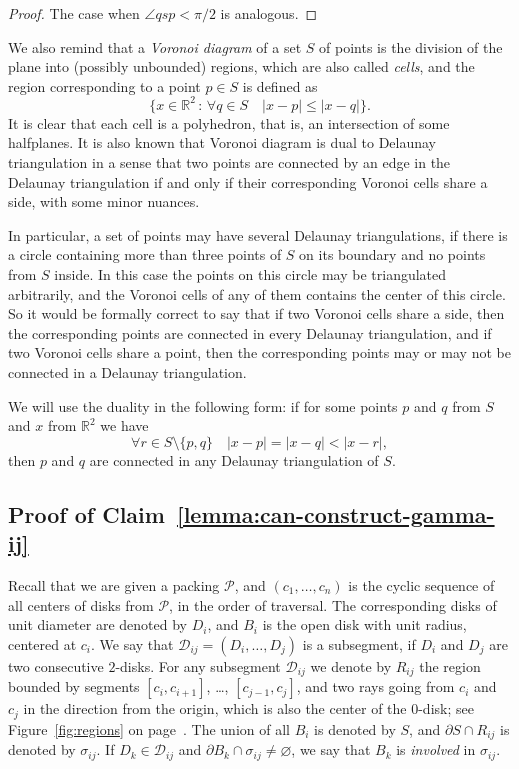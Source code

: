 \begin{appendices}
\begin{proof}
The case when $\angle{qsp} < \pi/2$ is analogous.
\end{proof}

We also remind that a \emph{Voronoi diagram} of a set $S$ of points is the division of the plane into (possibly unbounded) regions, which are also called \emph{cells}, and the region corresponding to a point $p\in S$ is defined as
$$\{x\in\mathbb{R}^2\,\colon\,\forall q\in S\quad |x - p|\leq |x - q|\}.$$
It is clear that each cell is a polyhedron, that is, an intersection of some halfplanes. It is also known that Voronoi diagram is dual to Delaunay triangulation in a sense that two points are connected by an edge in the Delaunay triangulation if and only if their corresponding Voronoi cells share a side, with some minor nuances.

In particular, a set of points may have several Delaunay triangulations, if there is a circle containing more than three points of $S$ on its boundary and no points from $S$ inside. In this case the points on this circle may be triangulated arbitrarily, and the Voronoi cells of any of them contains the center of this circle. So it would be formally correct to say that if two Voronoi cells share a side, then the corresponding points are connected in every Delaunay triangulation, and if two Voronoi cells share a point, then the corresponding points may or may not be connected in a Delaunay triangulation.

We will use the duality in the following form: if for some points $p$ and $q$ from $S$ and $x$ from $\mathbb{R}^2$ we have
$$\forall r\in S\setminus\{p, q\}\quad |x - p| = |x - q| < |x - r|,$$
then $p$ and $q$ are connected in any Delaunay triangulation of $S$.

\subsection{Proof of Claim~\ref{lemma:can-construct-gamma-ij}}

Recall that we are given a packing $\mathcal{P}$, and $(c_1, \ldots, c_n)$ is the cyclic sequence of all centers of disks from $\mathcal{P}$, in the order of traversal. The corresponding disks of unit diameter are denoted by $D_i$, and $B_i$ is the open disk with unit radius, centered at $c_i$. We say that $\mathcal{D}_{ij} = (D_i, \ldots, D_j)$ is a subsegment, if $D_i$ and $D_j$ are two consecutive $2$-disks. For any subsegment $\mathcal{D}_{ij}$ we denote by $R_{ij}$ the region bounded by segments $[c_i, c_{i+1}]$, \ldots, $[c_{j-1}, c_j]$, and two rays going from $c_i$ and $c_j$ in the direction from the origin, which is also the center of the $0$-disk; see Figure~\ref{fig:regions} on page~\pageref{fig:division-into-regions}. The union of all $B_i$ is denoted by $S$, and $\partial{S}\cap R_{ij}$ is denoted by $\sigma_{ij}$. If $D_k\in\mathcal{D}_{ij}$ and $\partial{B_k}\cap\sigma_{ij}\neq\varnothing$, we say that $B_k$ is \emph{involved} in $\sigma_{ij}$.


\end{appendices}
